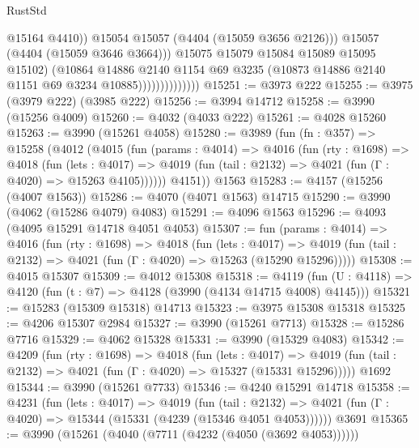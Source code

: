 \begin{lexlean}{RustStd}
\begin{coremodule}
                                      @15164
                                      @4410))
                                  @15054
                                  @15057
                                  (@4404 (@15059 @3656 @2126)))
                                @15057
                                (@4404 (@15059 @3646 @3664)))
                              @15075
                              @15079
                              @15084
                              @15089
                              @15095
                              @15102)
                            (@10864
                              @14886
                              @2140
                              @1154
                              @69
                              @3235
                              (@10873 @14886 @2140 @1151 @69 @3234 @10885))))))))))))))
@15251 := @3973 @222
@15255 := @3975 (@3979 @222) (@3985 @222)
@15256 := @3994 @14712
@15258 := @3990 (@15256 @4009)
@15260 := @4032 (@4033 @222)
@15261 := @4028 @15260
@15263 := @3990 (@15261 @4058)
@15280 := @3989
    (fun (fn : @357) =>
    @15258
      (@4012
        (@4015
          (fun (params : @4014) =>
          @4016
            (fun (rty : @1698) =>
            @4018
              (fun (lets : @4017) =>
              @4019 (fun (tail : @2132) => @4021 (fun (Γ : @4020) => @15263 @4105))))))
        @4151))
    @1563
@15283 := @4157 (@15256 (@4007 @1563))
@15286 := @4070 (@4071 @1563) @14715
@15290 := @3990 (@4062 (@15286 @4079) @4083)
@15291 := @4096 @1563
@15296 := @4093 (@4095 @15291 @14718 @4051 @4053)
@15307 := fun (params : @4014) =>
  @4016
    (fun (rty : @1698) =>
    @4018
      (fun (lets : @4017) =>
      @4019 (fun (tail : @2132) => @4021 (fun (Γ : @4020) => @15263 (@15290 @15296)))))
@15308 := @4015 @15307
@15309 := @4012 @15308
@15318 := @4119
    (fun (U : @4118) => @4120 (fun (t : @7) => @4128 (@3990 (@4134 @14715 @4008) @4145)))
@15321 := @15283 (@15309 @15318) @14713
@15323 := @3975 @15308 @15318
@15325 := @4206 @15307 @2984
@15327 := @3990 (@15261 @7713)
@15328 := @15286 @7716
@15329 := @4062 @15328
@15331 := @3990 (@15329 @4083)
@15342 := @4209
    (fun (rty : @1698) =>
    @4018
      (fun (lets : @4017) =>
      @4019 (fun (tail : @2132) => @4021 (fun (Γ : @4020) => @15327 (@15331 @15296)))))
    @1692
@15344 := @3990 (@15261 @7733)
@15346 := @4240 @15291 @14718
@15358 := @4231
    (fun (lets : @4017) =>
    @4019
      (fun (tail : @2132) =>
      @4021 (fun (Γ : @4020) => @15344 (@15331 (@4239 (@15346 @4051 @4053))))))
    @3691
@15365 := @3990 (@15261 (@4040 (@7711 (@4232 (@4050 (@3692 @4053))))))

\end{coremodule}
\end{lexlean}
